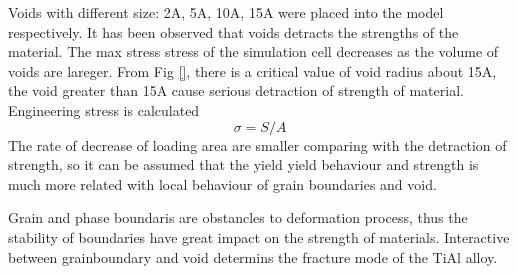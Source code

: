 \documentclass[journal,article,submit,moreauthors,pdftex,10pt,a4paper]{Definitions/mdpi}
\begin{document}
	
	
 	
	
Voids with different size: 2A, 5A, 10A, 15A were placed into the model respectively. It has been observed that  voids detracts the strengths of the material. The max stress stress of the simulation cell decreases as the volume of voids are lareger. From Fig \ref{}, there is a critical value of void radius about 15A, the void greater than 15A cause serious detraction of strength of material. 
Engineering stress is calculated
	$$ \sigma = S/A$$
The rate of decrease of loading area are smaller comparing with the detraction of strength, so it can be assumed that the yield yield behaviour and strength is much more related with local behaviour of grain boundaries and void.
	
Grain and phase boundaris are obstancles to deformation process, thus the stability of boundaries have great impact on the strength of materials. Interactive between grainboundary and void determins the fracture mode of the TiAl alloy.
	
\end{document}

